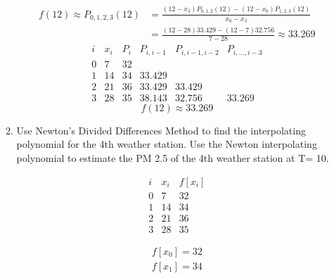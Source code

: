 \documentclass{exam}
\begin{document}
\begin{enumerate}
\begin{enumerate}
\begin{equation*}
        \end{equation*}
        \begin{align*}
            f(12) \approx P_{0,1,2,3}(12) &= \frac{(12-x_3)P_{0,1,2}(12)-(12-x_0)P_{1,2,3}(12)}{x_0-x_3}\\
            &= \frac{(12-28)33.429-(12-7)32.756}{7-28}\approx 33.269
        \end{align*}
        \begin{equation*}
            \begin{array}{cccccc}
                i & x_i & P_i & P_{i,i-1} & P_{i,i-1,i-2} & P_{i,...,i-3}\\\hline
                0 & 7   & 32\\
                1 & 14  & 34  & 33.429\\
                2 & 21  & 36  & 33.429    & 33.429\\
                3 & 28  & 35  & 38.143    & 32.756        & 33.269
            \end{array}
        \end{equation*}
        \begin{equation*}
            f(12) \approx \mathbf{33.269}
        \end{equation*}
        \newpage
        \item Use Newton's Divided Differences Method to find the interpolating polynomial for the 4th weather station. Use the Newton interpolating polynomial to estimate the PM 2.5 of the 4th weather station at T= 10.
        \newline
        \begin{minipage}{0.25\textwidth}
            \begin{equation*}
                \begin{array}{ccc}
                    i & x_i & f[x_i]\\\hline
                    0 & 7   & 32\\
                    1 & 14  & 34\\
                    2 & 21  & 36\\
                    3 & 28  & 35
                \end{array}
            \end{equation*}
        \end{minipage}
        \begin{minipage}{0.1\textwidth} 
            \begin{align*}
                f[x_0] = 32\\
                f[x_1] = 34\\

\end{align*}
\end{minipage}
\end{enumerate}
\end{enumerate}
\end{document}
